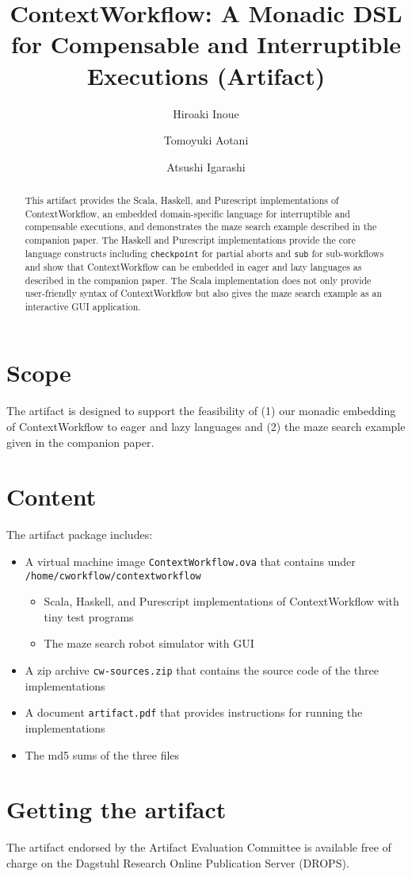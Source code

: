 \documentclass[a4paper,UKenglish]{darts-v2018}
\title{ContextWorkflow: A Monadic DSL for Compensable and Interruptible Executions (Artifact)}
\author{Hiroaki Inoue}{Graduate School of Informatics, Kyoto University, Kyoto, Japan}{hinoue@fos.kuis.kyoto-u.ac.jp}{}{The current affiliation is Mitsubishi Electric Corporation.}
\author{Tomoyuki Aotani}{School of Computing, Tokyo Institute of Technology, Tokyo, Japan}{aotani@c.titech.ac.jp}{}{}
\author{Atsushi Igarashi}{Graduate School of Informatics, Kyoto University, Kyoto, Japan}{igarashi@kuis.kyoto-u.ac.jp}{}{}
\newenvironment{scope}{\section{Scope}}{}
\newenvironment{content}{\section{Content}}{}
\newenvironment{getting}{\section{Getting the artifact} The artifact 
endorsed by the Artifact Evaluation Committee is available free of 
charge on the Dagstuhl Research Online Publication Server (DROPS).}{}
\begin{document}
\maketitle

\begin{abstract}
  This artifact provides the Scala, Haskell, and Purescript
  implementations of ContextWorkflow, an embedded domain-specific
  language for interruptible and compensable executions, and
  demonstrates the maze search example described in the companion
  paper. The Haskell and Purescript implementations provide the core
  language constructs including \texttt{checkpoint} for partial aborts
  and \texttt{sub} for sub-workflows and show that ContextWorkflow can
  be embedded in eager and lazy languages as described in the
  companion paper. The Scala implementation does not only provide
  user-friendly syntax of ContextWorkflow but also gives the maze
  search example as an interactive GUI application.
 \end{abstract}

 \begin{scope}
   The artifact is designed to support the feasibility of (1) our
   monadic embedding of ContextWorkflow to eager and lazy languages
   and (2) the maze search example given in the companion paper.
\end{scope}

\begin{content}
The artifact package includes:
\begin{itemize}
\item A virtual machine image \texttt{ContextWorkflow.ova} that
  contains under \texttt{/home/cworkflow/contextworkflow}
  \begin{itemize}
  \item Scala, Haskell, and Purescript implementations of
    ContextWorkflow with tiny test programs
  \item The maze search robot simulator with GUI
  \end{itemize}
\item A zip archive \texttt{cw-sources.zip} that contains the source
  code of the three implementations
\item A document \texttt{artifact.pdf} that provides instructions for
  running the implementations
\item The md5 sums of the three files
\end{itemize}
\end{content}

\begin{getting}
\end{getting}
\end{document}
